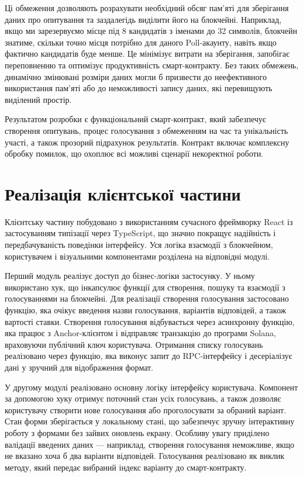 \documentclass[14pt]{extreport}
\begin{document}
  Ці обмеження дозволяють розрахувати необхідний обсяг пам'яті для зберігання даних про опитування та заздалегідь виділити його на блокчейні. Наприклад, якщо ми зарезервуємо місце під 8 кандидатів з іменами до 32 символів, блокчейн знатиме, скільки точно місця потрібно для даного Poll-акаунту, навіть якщо фактично кандидатів буде менше. Це мінімізує витрати на зберігання, запобігає переповненню та оптимізує продуктивність смарт-контракту. Без таких обмежень, динамічно змінювані розміри даних могли б призвести до неефективного використання пам'яті або до неможливості запису даних, які перевищують виділений простір.

  Результатом розробки є функціональний смарт-контракт, який забезпечує створення опитувань, процес голосування з обмеженням на час та унікальність участі, а також прозорий підрахунок результатів. Контракт включає комплексну обробку помилок, що охоплює всі можливі сценарії некоректної роботи.
  
  \section{Реалізація клієнтської частини}
  
  Клієнтську частину побудовано з використанням сучасного фреймворку React із застосуванням типізації через TypeScript, що значно покращує надійність і передбачуваність поведінки інтерфейсу. Уся логіка взаємодії з блокчейном, користувачем і візуальними компонентами розділена на відповідні модулі.

  Перший модуль реалізує доступ до бізнес-логіки застосунку. У ньому використано хук, що інкапсулює функції для створення, пошуку та взаємодії з голосуваннями на блокчейні. Для реалізації створення голосування застосовано функцію, яка очікує введення назви голосування, варіантів відповідей, а також вартості ставки. Створення голосування відбувається через асинхронну функцію, яка працює з Anchor-клієнтом і відправляє транзакцію до програми Solana, враховуючи публічний ключ користувача. Отримання списку голосувань реалізовано через функцію, яка виконує запит до RPC-інтерфейсу і десеріалізує дані у зручний для відображення формат.

  У другому модулі реалізовано основну логіку інтерфейсу користувача. Компонент за допомогою хуку отримує поточний стан усіх голосувань, а також дозволяє користувачу створити нове голосування або проголосувати за обраний варіант. Стан форми зберігається у локальному стані, що забезпечує зручну інтерактивну роботу з формами без зайвих оновлень екрану. Особливу увагу приділено валідації введених даних — наприклад, створення голосування неможливе, якщо не вказано хоча б два варіанти відповідей. Голосування реалізовано як виклик методу, який передає вибраний індекс варіанту до смарт-контракту.
\end{document}
